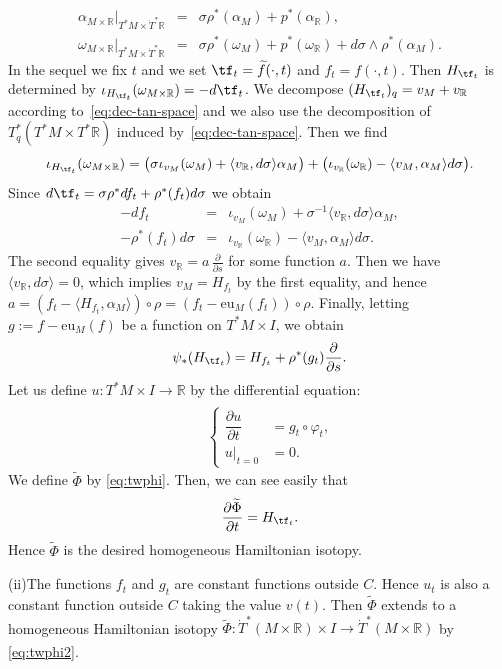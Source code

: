 \documentclass[12pt,leqno]{article}
\theoremstyle{definition}
\newcommand{\R}{{\mathbb{R}}}
\def\phi{{\varphi}}
\renewcommand{\to}[1][]{\xrightarrow[]{#1}}
\newcommand{\seteq}{\mathbin{:=}}
\newcommand{\cl}{\colon}
\newcommand{\tw}[1]{\widetilde{#1}}
\newcommand{\ba}{\begin{array}}
\newcommand{\ea}{\end{array}}
\newcommand{\eq}{\begin{eqnarray}}
\newcommand{\eneq}{\end{eqnarray}}
\newcommand{\eqn}{\begin{eqnarray*}}
\newcommand{\eneqn}{\end{eqnarray*}}
\newcommand{\dT}{{\dot{T}}}
\newcommand{\eu}{\mathrm{eu}}
\numberwithin{equation}{section}
\begin{document}
\eqn
\alpha_{M\times \R}|_{T^*M\times\dT^*\R}
&=& \sigma \rho^*(\alpha_M) + p^*(\alpha_\R),  \\
\omega_{M\times \R}|_{T^*M\times\dT^*\R}
&=&  \sigma \rho^*(\omega_M) + p^*(\omega_\R)
+ d\sigma \wedge \rho^*(\alpha_M).
\eneqn
In the sequel we fix $t$ and we set $\tf_t=\tw f(\cdot,t)$
and $f_t= f(\cdot,t)$.
Then $H_{\tf_t}$ is determined by $\iota_{H_{\tf_t}} (\omega_{M\times \R})
= - d\tf_t$. We decompose $(H_{\tf_t})_q = v_M +v_\R$ according
to~\eqref{eq:dec-tan-space} and we also use the decomposition of
$T^*_q(T^*M\times T^*\R )$ induced by~\eqref{eq:dec-tan-space}.
Then we find
$$
\iota_{H_{\tf_t}} (\omega_{M\times \R})
= \bigl(
\sigma \iota_{v_M}(\omega_M) + \langle v_\R, d\sigma \rangle \alpha_M
\bigr)  + \bigl(
 \iota_{v_\R}(\omega_\R) - \langle v_M, \alpha_M \rangle d\sigma
\bigr).
$$
Since $d\tf_t = \sigma \rho^* df_t + \rho^*(f_t) d\sigma$ we obtain
\eqn
- df_t&=& \iota_{v_M}(\omega_M)
+ \sigma^{-1} \langle v_\R, d\sigma \rangle \alpha_M,\\
- \rho^*(f_t) d\sigma &=& \iota_{v_\R}(\omega_\R) 
- \langle v_M, \alpha_M \rangle d\sigma.
\eneqn
The second equality gives $v_\R = a\, \frac{\partial}{\partial s}$ for some
function $a$. Then we have $\langle v_\R, d\sigma \rangle =0$, which implies
$v_M = H_{f_t}$ by the first equality, and hence
$a= (f_t - \langle H_{f_t}, \alpha_M \rangle) \circ \rho
= (f_t - \eu_M(f_t))\circ \rho$. Finally, letting
$g\seteq f-\eu_M(f)$ be a function on $T^*M\times I$,
we obtain
$$
\psi_*(H_{\tf_t}) = H_{f_t}
+ \rho^*(g_t)\frac{\partial}{\partial s} .
$$
Let us define $u\cl T^*M\times I\to \R$ by the differential equation:
\eq
&&\left\{\ba{rl}
\dfrac{\partial u}{\partial t}&=g_t\circ \phi_t,\\[1ex]
u\vert_{t=0}&=0.
\ea\right.
\eneq
We define $\tw \Phi$ by \eqref{eq:twphi}.
Then, we can see easily that 
$$
\dfrac{\partial\tw\Phi}{\partial t}=H_{\tf_t}.
$$
Hence $\tw\Phi$ is the desired homogeneous Hamiltonian isotopy.

\bigskip
\noindent
(ii)\quad The functions $f_t$ and $g_t$ are constant functions outside $C$.
Hence $u_t$ is also a constant function outside $C$ taking the value
$v(t)$.
Then %
$\tw\Phi$ extends
to a homogeneous Hamiltonian isotopy
$\tw \Phi\cl \dT^*(M\times \R)\times I\to \dT^*(M\times\R)$
by \eqref{eq:twphi2}.
\QED
\end{document}
